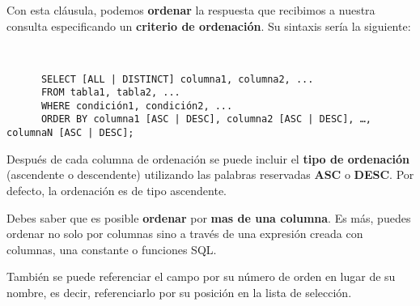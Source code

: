 Con esta cláusula, podemos \textbf{ordenar} la respuesta que recibimos a nuestra consulta especificando un \textbf{criterio de ordenación}. Su sintaxis sería la siguiente:

\begin{tcolorbox}[sharp corners, colback=yellow!30, colframe=white!20]
    \scriptsize
    \begin{verbatim}


      SELECT [ALL | DISTINCT] columna1, columna2, ...
      FROM tabla1, tabla2, ...
      WHERE condición1, condición2, ...
      ORDER BY columna1 [ASC | DESC], columna2 [ASC | DESC], …, columnaN [ASC | DESC];
    \end{verbatim}
\end{tcolorbox}

Después de cada columna de ordenación se puede incluir el \textbf{tipo de ordenación} (ascendente o descendente) utilizando las palabras reservadas \textbf{ASC} o \textbf{DESC}. Por defecto, la ordenación es de tipo ascendente.

Debes saber que es posible \textbf{ordenar} por \textbf{mas de una columna}. Es más, puedes ordenar no solo por columnas sino a través de una expresión creada con columnas, una constante o funciones SQL.

También se puede referenciar el campo por su número de orden en lugar de su nombre, es decir, referenciarlo por su posición en la lista de selección.

